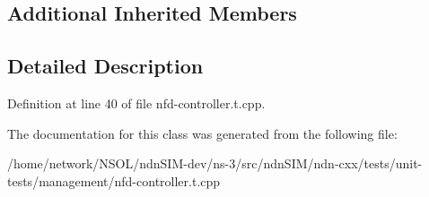 \subsection*{Additional Inherited Members}


\subsection{Detailed Description}


Definition at line 40 of file nfd-\/controller.\+t.\+cpp.



The documentation for this class was generated from the following file\+:\begin{DoxyCompactItemize}
\item 
/home/network/\+N\+S\+O\+L/ndn\+S\+I\+M-\/dev/ns-\/3/src/ndn\+S\+I\+M/ndn-\/cxx/tests/unit-\/tests/management/nfd-\/controller.\+t.\+cpp\end{DoxyCompactItemize}
